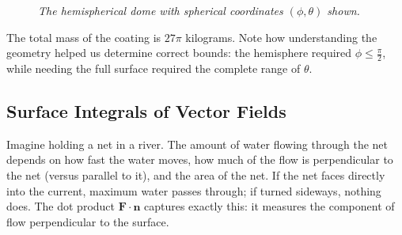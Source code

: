 \begin{example}
\begin{solution}
\begin{figure}[H] 
\centering
{}


\caption{\textit{The hemispherical dome with spherical coordinates $(\phi,\theta)$ shown.}}
\end{figure}
\noindent The total mass of the coating is $27\pi$ kilograms. Note how understanding the geometry helped us determine correct bounds: the hemisphere required $\phi \leq \frac{\pi}{2}$, while needing the full surface required the complete range of $\theta$.

\end{solution}
\end{example}
\exampleline

\subsection*{Surface Integrals of Vector Fields}

\noindent Imagine holding a net in a river. The amount of water flowing through the net depends on how fast the water moves, how much of the flow is perpendicular to the net (versus parallel to it), and the area of the net. If the net faces directly into the current, maximum water passes through; if turned sideways, nothing does. The dot product \( \mathbf{F} \cdot \mathbf{n} \) captures exactly this: it measures the component of flow perpendicular to the surface.\\ \\

